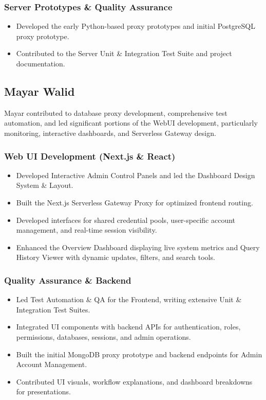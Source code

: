 \subsubsection{Server Prototypes \& Quality Assurance}
\begin{itemize}
    \item Developed the early Python-based proxy prototypes and initial PostgreSQL proxy prototype.
    \item Contributed to the Server Unit \& Integration Test Suite and project documentation.
\end{itemize}


\subsection{Mayar Walid}

Mayar contributed to database proxy development, comprehensive test automation, and led significant portions of the WebUI development, particularly monitoring, interactive dashboards, and Serverless Gateway design.

\subsubsection{Web UI Development (Next.js \& React)}
\begin{itemize}
    \item Developed Interactive Admin Control Panels and led the Dashboard Design System \& Layout.
    \item Built the Next.js Serverless Gateway Proxy for optimized frontend routing.
    \item Developed interfaces for shared credential pools, user-specific account management, and real-time session visibility.
    \item Enhanced the Overview Dashboard displaying live system metrics and Query History Viewer with dynamic updates, filters, and search tools.
\end{itemize}

\subsubsection{Quality Assurance \& Backend}
\begin{itemize}
    \item Led Test Automation \& QA for the Frontend, writing extensive Unit \& Integration Test Suites.
    \item Integrated UI components with backend APIs for authentication, roles, permissions, databases, sessions, and admin operations.
    \item Built the initial MongoDB proxy prototype and backend endpoints for Admin Account Management.
    \item Contributed UI visuals, workflow explanations, and dashboard breakdowns for presentations.
\end{itemize}

